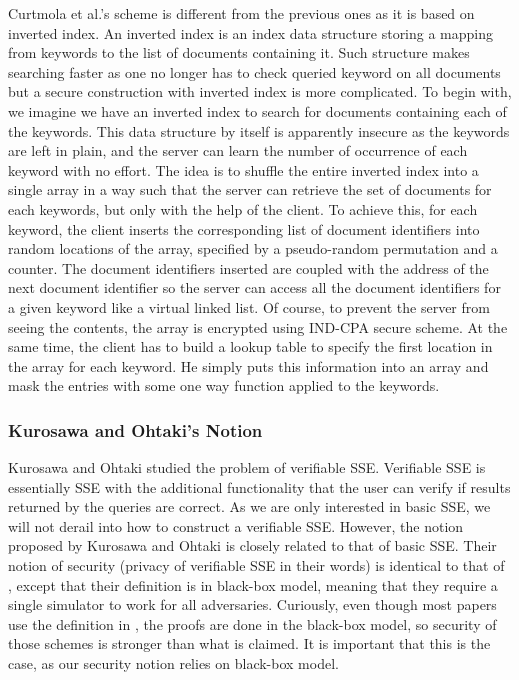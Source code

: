 Curtmola et al.'s scheme is different from the previous ones as it is based on inverted index. An inverted index is an index data structure storing a mapping from keywords to the list of documents containing it. Such structure makes searching faster as one no longer has to check queried keyword on all documents but a secure construction with inverted index is more complicated. To begin with, we imagine we have an inverted index to search for documents containing each of the keywords. This data structure by itself is apparently insecure as the keywords are left in plain, and the server can learn the number of occurrence of each keyword with no effort. The idea is to shuffle the entire inverted index into a single array in a way such that the server can retrieve the set of documents for each keywords, but only with the help of the client. To achieve this, for each keyword, the client inserts the corresponding list of document identifiers into random locations of the array, specified by a pseudo-random permutation and a counter. The document identifiers inserted are coupled with the address of the next document identifier so the server can access all the document identifiers for a given keyword like a virtual linked list. Of course, to prevent the server from seeing the contents, the array is encrypted using IND-CPA secure scheme. At the same time, the client has to build a lookup table to specify the first location in the array for each keyword. He simply puts this information into an array and mask the entries with some one way function applied to the keywords.




\subsubsection{Kurosawa and Ohtaki's Notion}
Kurosawa and Ohtaki \cite{FC:KurOht12} studied the problem of verifiable SSE. Verifiable SSE is essentially SSE with the additional functionality that the user can verify if results returned by the queries are correct. As we are only interested in basic SSE, we will not derail into how to construct a verifiable SSE. However, the notion proposed by Kurosawa and Ohtaki is closely related to that of basic SSE. Their notion of security (privacy of verifiable SSE in their words) is identical to that of \cite{CCS:CGKO06}, except that their definition is in black-box model, meaning that they require a single simulator to work for all adversaries. Curiously, even though most papers use the definition in \cite{CCS:CGKO06}, the proofs are done in the black-box model, so security of those schemes is stronger than what is claimed. It is important that this is the case, as our security notion relies on black-box model.




